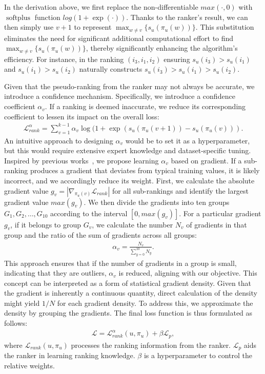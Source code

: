 In the derivation above, we first replace the non-differentiable $max(\cdot,0)$ with $\operatorname{softplus}$ function $log(1+\exp(\cdot))$. Thanks to the ranker's result, we can then simply use $v+1$ to represent $\max_{w \neq v}\{s_u(\pi_{u}(w))\}$. This substitution eliminates the need for significant additional computational effort to find $\max_{w \neq v}\{s_u(\pi_{u}(w))\}$, thereby significantly enhancing the algorithm's efficiency. For instance, in the ranking $(i_3, i_1, i_2)$ ensuring $s_u(i_3) > s_u(i_1)$ and $s_u(i_1) > s_u(i_2)$ naturally constructs $s_u(i_3) > s_u(i_1) > s_u(i_2)$.

Given that the pseudo-ranking from the ranker may not always be accurate, we introduce a confidence mechanism. Specifically, we introduce a confidence coefficient $\alpha_v$. If a ranking is deemed inaccurate, we reduce its corresponding coefficient to lessen its impact on the overall loss:
\begin{align}
\mathcal{L}_{rank}^{\alpha} = \sum_{v=1}^{k-1} \alpha_{v} \log(1+\exp(s_u(\pi_{u}(v+1)) - s_u(\pi_{u}(v))).
\end{align}
An intuitive approach to designing $\alpha_{v}$ would be to set it as a hyperparameter, but this would require extensive expert knowledge and dataset-specific tuning. Inspired by previous works~\cite{GDH22,LLW19,WWS22}, we propose learning $\alpha_v$ based on gradient. If a sub-ranking produces a gradient that deviates from typical training values, it is likely incorrect, and we accordingly reduce its weight. First, we calculate the absolute gradient value $g_{v} = |\nabla_{\pi_{u}(v)} \mathcal{L}_{rank}|$ for all sub-rankings and identify the largest gradient value $max(g_{v})$. We then divide the gradients into ten groups ${G_1,G_2, \ldots, G_{10}}$ according to the interval  $[0, max(g_{v})]$. For a particular gradient $g_v$, if it belongs to group $G_v$, we calculate the number $N_{v}$ of gradients in that group and the ratio of the sum of gradients across all groups:
\begin{align}
\alpha_{v} = \frac{N_v}{\sum_{y=0}^{10}N_y}.
\end{align}
This approach ensures that if the number of gradients in a group is small, indicating that they are outliers, $\alpha_{v}$ is reduced, aligning with our objective. This concept can be interpreted as a form of statistical gradient density. Given that the gradient is inherently a continuous quantity, direct calculation of the density might yield $1/N$ for each gradient density. To address this, we approximate the density by grouping the gradients. The final loss function is thus formulated as follows:
\begin{align}
\mathcal{L} = \mathcal{L}_{rank}^{\alpha}(u,\pi_u) + \beta \mathcal{L}_p,
\end{align}
where $\mathcal{L}_{rank}(u,\pi_u)$ processes the ranking information from the ranker. $\mathcal{L}_p$ aids the ranker in learning ranking knowledge. $\beta$ is a hyperparameter to control the relative weights.

